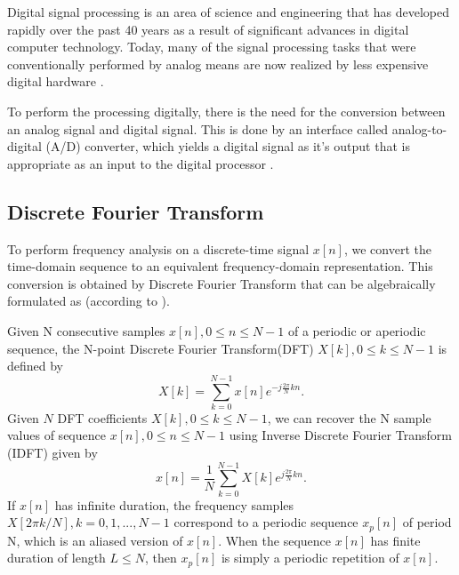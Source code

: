 \documentclass[twoside]{ctuthesis}
\theoremstyle{plain}
\theoremstyle{definition}
\theoremstyle{note}
\begin{document}
	Digital signal processing is an area of science and engineering that has developed rapidly over the past 40 years as a result of significant advances in digital computer technology. Today, many of the signal processing tasks that were conventionally performed by analog means are now realized by less expensive digital hardware \cite{cite:2}.
	
	To perform the processing digitally, there is the need for the conversion between an analog signal and digital signal. This is done by an interface called analog-to-digital (A/D) converter, which yields a digital signal as it's output that is appropriate as an input to the digital processor \cite{cite:2,cite:3}.
	
\subsection{Discrete Fourier Transform}
\label{sec:DiscreteFourierTransform}
To perform frequency analysis on a discrete-time signal ${x[n]}$, we convert the time-domain sequence to an equivalent frequency-domain representation. This conversion is obtained by Discrete Fourier Transform that can be algebraically formulated as (according to \cite{cite:2,cite:3}).
	
Given N consecutive samples $x[n], 0 \leq n \leq N-1$ of a periodic or aperiodic sequence, the N-point Discrete Fourier Transform(DFT) $X[k], 0 \leq k \leq N-1$ is defined by
\begin{equation} \label{eq:DFT}
X[k]=\sum_{k=0}^{N-1}x[n]e^{-j \frac{2 \pi}{N} kn}.
\end{equation}
Given $N$ DFT coefficients $X[k], 0 \leq k \leq N-1$, we can recover the N sample values of sequence $x[n], 0 \leq n \leq N-1$ using Inverse Discrete Fourier Transform (IDFT) given by
\begin{equation} \label{eq:IDFT}
x[n]=\frac{1}{N} \sum_{k=0}^{N-1}X[k]e^{j \frac{2 \pi}{N} kn}.
\end{equation}
If $x[n]$ has infinite duration, the frequency samples  $X[2 \pi k/ N], k=0, 1, ..., N-1$ correspond to a periodic sequence $x_{p}[n]$ of period N, which is an aliased version of $x[n]$. When the sequence $x[n]$ has finite duration of length $L \leq N$, then  $x_{p}[n]$ is simply a periodic repetition of $x[n]$.
\end{document}
